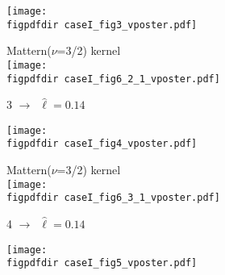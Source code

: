 \documentclass[portrait,a1,final]{a0poster} %
\def\figpdfdir{fig/} %
\begin{document}
\begin{minipage}{1\linewidth}
\begin{minipage}[t]{0.48\textwidth}
\begin{minipage}[t]{0.49\textwidth}
\begin{minipage}[t]{0.45\textwidth}
\vspace{0.3cm}
\texttt{[image: \\figpdfdir caseI\_fig3\_vposter.pdf]}

\end{minipage}
\begin{minipage}[t]{0.50\textwidth}
\vspace{-0.5cm}
\hspace{0.25\textwidth}  \tiny Mattern($\nu$=3/2) kernel\\
\texttt{[image: \\figpdfdir caseI\_fig6\_2\_1\_vposter.pdf]}

\end{minipage}

\end{minipage}


\vspace{5mm}
\begin{minipage}[t]{0.49\textwidth}

\begin{minipage}[t]{0.45\textwidth}
{\large 3}\hspace{0.7cm}  $\to$\, {\scriptsize$\hat{\ell}=0.14$}

\vspace{0.3cm}
\texttt{[image: \\figpdfdir caseI\_fig4\_vposter.pdf]}

\end{minipage}
\begin{minipage}[t]{0.50\textwidth}
\vspace{-0.5cm}
\hspace{0.25\textwidth}  \tiny Mattern($\nu$=3/2) kernel\\
\texttt{[image: \\figpdfdir caseI\_fig6\_3\_1\_vposter.pdf]}

\end{minipage}

\end{minipage}
\begin{minipage}[t]{0.49\textwidth}

\begin{minipage}[t]{0.45\textwidth}
{\large 4}\hspace{0.7cm}  $\to$\, {\scriptsize$\hat{\ell}=0.14$}

\vspace{0.3cm}
\texttt{[image: \\figpdfdir caseI\_fig5\_vposter.pdf]}


\end{minipage}
\end{minipage}
\end{minipage}
\end{minipage}
\end{document}
